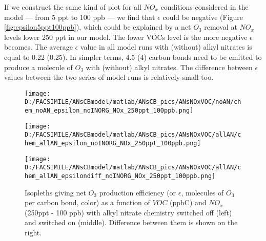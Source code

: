 \documentclass[11pt,a4paper]{article}
\begin{document}
If we construct the same kind of plot for all $NO_x$ conditions considered in the model --- from 5 ppt to 100 ppb --- we find that $\epsilon$ could be negative (Figure \ref{fig:epsilon5ppt100ppb}), which could be explained by a net $O_3$ removal at $NO_x$ levels lower 250 ppt in our model. The lower VOCs level is the more negative $\epsilon$ becomes. The average $\epsilon$ value in all model runs with (without) alkyl nitrates is equal to 0.22 (0.25). In simpler terms, 4.5 (4) carbon bonds need to be emitted to produce a molecule of $O_3$ with (without) alkyl nitrates. The difference between $\epsilon$ values between the two series of model runs is relatively small too.

\begin{figure} %
\centering
\begin{minipage}{.3\textwidth}
  \centering
  \texttt{[image: D:/FACSIMILE/ANsCBmodel/matlab/ANsCB\_pics/ANsNOxVOC/noAN/chem\_noAN\_epsilon\_noINORG\_NOx\_250ppt\_100ppb.png]}
\end{minipage}
\begin{minipage}{.3\textwidth}
  \centering
  \texttt{[image: D:/FACSIMILE/ANsCBmodel/matlab/ANsCB\_pics/ANsNOxVOC/allAN/chem\_allAN\_epsilon\_noINORG\_NOx\_250ppt\_100ppb.png]}
\end{minipage}
\begin{minipage}{.3\textwidth}
  \centering
  \texttt{[image: D:/FACSIMILE/ANsCBmodel/matlab/ANsCB\_pics/ANsNOxVOC/allAN/chem\_allAN\_epsilondiff\_noINORG\_NOx\_250ppt\_100ppb.png]}
\end{minipage}
\caption{Isopleths giving net $O_3$ production efficiency (or $\epsilon$, molecules of $O_3$ per carbon bond, color) as a function of $VOC$ (ppbC) and $NO_x$ (250ppt - 100 ppb) with alkyl nitrate chemistry switched off (left) and switched on (middle). Difference between them is shown on the right.}\label{fig:epsilon250ppt100ppb}
\end{figure}
\end{document}

